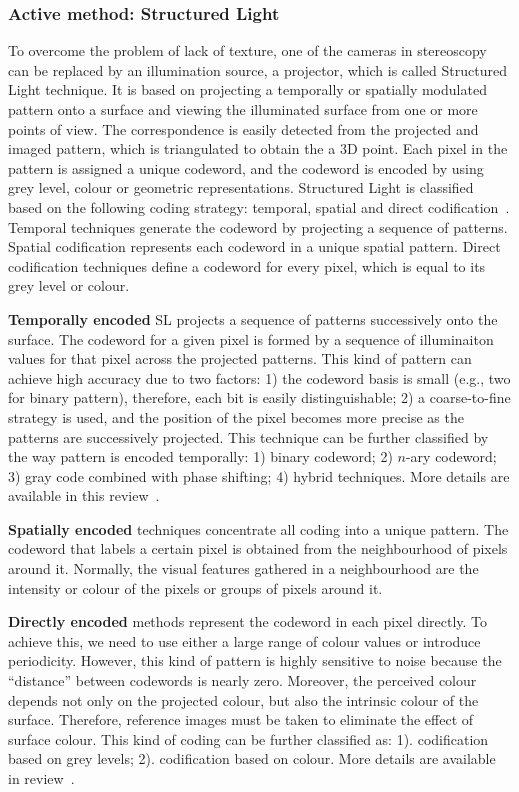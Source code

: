 \subsubsection{Active method: Structured Light}
To overcome the problem of lack of texture, one of the cameras in stereoscopy can be replaced by an illumination source, \eg a projector, which is called Structured Light technique. It is based on projecting a temporally or spatially modulated pattern onto a surface and viewing the illuminated surface from one or more points of view. The correspondence is easily detected from the projected and imaged pattern, which is triangulated to obtain the a 3D point. Each pixel in the pattern is assigned a unique codeword, and the codeword is encoded by using grey level, colour or geometric representations. Structured Light is classified based on the following coding strategy: temporal, spatial and direct codification~\cite{salvi2004pattern}. Temporal techniques generate the codeword by projecting a sequence of patterns. Spatial codification represents each codeword in a unique spatial pattern. Direct codification techniques define a codeword for every pixel, which is equal to its grey level or colour.

\textbf{Temporally encoded} SL projects a sequence of patterns successively onto the surface. The codeword for a given pixel is formed by a sequence of illuminaiton values for that pixel across the projected patterns. This kind of pattern can achieve high accuracy due to two factors: 1) the codeword basis is small (e.g., two for binary pattern), therefore, each bit is easily distinguishable; 2) a coarse-to-fine strategy is used, and the position of the pixel becomes more precise as the patterns are successively projected. This technique can be further classified by the way pattern is encoded temporally: 1) binary codeword; 2) $n$-ary codeword; 3) gray code combined with phase shifting; 4) hybrid techniques. More details are available in this review~\cite{salvi2004pattern}.

\textbf{Spatially encoded} techniques concentrate all coding into a unique pattern. The codeword that labels a certain pixel is obtained from the neighbourhood of pixels around it. Normally, the visual features gathered in a neighbourhood are the intensity or colour of the pixels or groups of pixels around it.

\textbf{Directly encoded} methods represent the codeword in each pixel directly. To achieve this, we need to use either a large range of colour values or introduce periodicity. However, this kind of pattern is highly sensitive to noise because the ``distance'' between codewords is nearly zero. Moreover, the perceived colour depends not only on the projected colour, but also the intrinsic colour of the surface. Therefore, reference images must be taken to eliminate the effect of surface colour. This kind of coding can be further classified as: 1). codification based on grey levels; 2). codification based on colour. More details are available in review~\cite{salvi2004pattern}.

